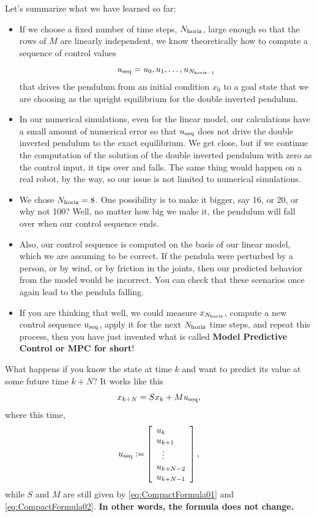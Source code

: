 Let's summarize what we  have learned so far:
\begin{itemize}
    \item If we choose a fixed number of time steps, $N_{\rm horiz}$, large enough so that the rows of $M$ are linearly independent, we know theoretically how to compute a sequence of control values 
    $$u_{\rm seq} = u_0, u_1, \ldots, u_{N_{\rm horiz -1}} $$
    that drives the pendulum from an initial condition $x_0$ to a goal state that we are choosing as the upright equilibrium for the double inverted pendulum.
    \item In our numerical simulations, even for the linear model, our calculations have a small amount of numerical error so that $u_{\rm seq}$ does not drive the double inverted pendulum to the exact equilibrium. We get close, but if we continue the computation of the solution of the double inverted pendulum with zero as the control input, it tips over and falls. The same thing would happen on a real robot, by the way, so our issue is not limited to numerical simulations.
    \item We chose $N_{\rm horiz}=8$. One possibility is to make it bigger, say 16, or 20, or why not 100? Well, no matter how big we make it, the pendulum will fall over when our control sequence ends.  
    \item Also, our control sequence is computed on the basis of our linear model, which we are assuming to be correct. If the pendula were perturbed by a person, or by wind, or by friction in the joints, then our predicted behavior from the model would be incorrect. You can check that these scenarios once again lead to the pendula falling. 
    \item If you are thinking that well, we could measure $x_{N_{\rm horiz}}$, compute a new control sequence $u_{\rm seq}$, apply it for the next $N_{\rm horiz}$ time steps, and repeat this process, then you have just invented what is called \textbf{Model Predictive Control or MPC for short}!
\end{itemize}

\begin{tcolorbox}[title=\textbf{\large From $x_k$ to $x_{k+N}$ as a function of the control sequence.}]

What happens if you know the state at time $k$ and want to predict its value at some future time $k+N$? It works like this
\begin{equation}
x_{k+N} = S x_k + M u_{\rm seq}, 
    \label{eq:GoldMine2}
\end{equation}
where this time, 
$$u_{\rm seq}:=\left[\begin{array}{l} u_k \\ u_{k+1} \\~~  \vdots \\ u_{k+N-2} \\ u_{k+N-1} \end{array} \right], $$
while $S$ and $M$ are still given by \eqref{eq:CompactFormula01} and \eqref{eq:CompactFormula02}.
\textbf{In other words, the formula does not change.} 
\end{tcolorbox}

